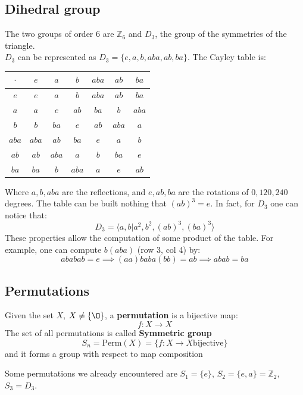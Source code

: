 \subsection{Dihedral group}
The two groups of order $6$ are $\mathbb{Z}_6$ and $D_3$, the group of the symmetries of the triangle.\\
$D_3$ can be represented as $D_3 = \{e,a,b,aba,ab,ba \}$. The Cayley table is:

\begin{center}
\begin{tabular}{c|cccccc}
  $\cdot$ & $e$ & $a$ & $b$ & $aba$ & $ab$ & $ba$ \\
\hline
$e$   & $e$   & $a$   & $b$   & $aba$ & $ab$  & $ba$  \\
$a$   & $a$   & $e$   & $ab$  & $ba$  & $b$   & $aba$ \\
$b$   & $b$   & $ba$  & $e$   & $ab$  & $aba$ & $a$   \\
$aba$ & $aba$ & $ab$  & $ba$  & $e$   & $a$   & $b$   \\
$ab$  & $ab$  & $aba$ & $a$   & $b$   & $ba$  & $e$   \\
$ba$  & $ba$  & $b$   & $aba$ & $a$   & $e$   & $ab$  \\
\end{tabular}
\end{center}

Where $a,b,aba$ are the reflections, and $e,ab,ba$ are the rotations of $0,120,240$ degrees. The table can be built nothing that $(ab)^3 =e$. In fact, for $D_3$ one can notice that:
\[
  D_3 = \langle a, b | a^2, b^2, (ab)^3, (ba)^3 \rangle
\]
These properties allow the computation of some product of the table. For example, one can compute $b(aba)$ (row 3, col 4) by:
\[
  ababab = e \implies (aa)baba(bb) = ab \implies abab = ba
\]
\subsection{Permutations}
\begin{definition}
Given the set $X$, $X \neq \{ \O \}$, a \textbf{permutation} is a bijective map:
\[
  f: X \to X
\]
The set of all permutations is called \textbf{Symmetric group}
\[
S_n = \text{Perm} ( X ) = \{f:X\to X \text{bijective}\}
\] 
and it forms a group with respect to map composition
\end{definition}
Some permutations we already encountered are $S_1 = \{e\}$, $S_2 = \{ e,a \} = \mathbb{Z}_2$, $S_3 = D_3$. 

